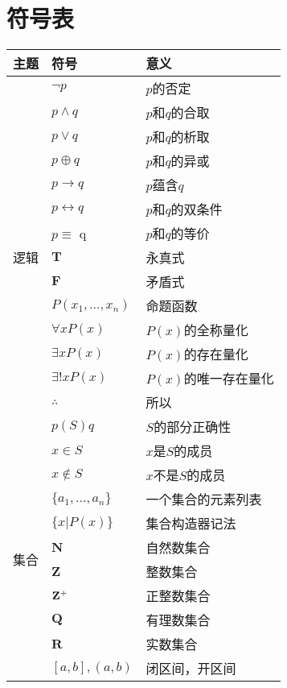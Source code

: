 \documentclass[UTF8]{ctexart}
\begin{document}
\section{符号表}
\begin{longtable}{|p{9em}|p{15em}|p{15em}|}
  \bottomrule
  \hfil 主题 & \hfil 符号 & \hfil 意义\\
  \hline
  \multirow{15}{9em}{逻辑} & $\neg p$ & $p$的否定\\
  \cline{2-3}
    & $p\land q$ & $p$和$q$的合取\\
  \cline{2-3}
    & $p\lor q$ & $p$和$q$的析取\\
  \cline{2-3}
    & $p\oplus q$ & $p$和$q$的异或\\
  \cline{2-3}
    & $p\rightarrow q$ & $p$蕴含$q$\\
  \cline{2-3}
    & $p\leftrightarrow q$ & $p$和$q$的双条件\\
  \cline{2-3}
    & $p\equiv$ q & $p$和$q$的等价\\
  \cline{2-3}
    & $\mathbf{T}$ & 永真式\\
  \cline{2-3}
    & $\mathbf{F}$ & 矛盾式\\
  \cline{2-3}
    & $P(x_1, ... , x_n)$ & 命题函数\\
  \cline{2-3}
    & $\forall xP(x)$ & $P(x)$的全称量化\\
  \cline{2-3}
    & $\exists xP(x)$ & $P(x)$的存在量化\\
  \cline{2-3}
    & $\exists !xP(x)$ & $P(x)$的唯一存在量化\\
  \cline{2-3}
    & $\therefore$ & 所以\\
  \cline{2-3}
    & $p(S)q$ & $S$的部分正确性\\
  \hline
  \multirow{28}{9em}{集合} & $x\in S$ & $x$是$S$的成员\\
  \cline{2-3}
    & $x\notin S$ & $x$不是$S$的成员\\
  \cline{2-3}
    & $\{a_1, ... , a_n\}$ & 一个集合的元素列表\\
  \cline{2-3}
    & $\{x|P(x)\}$ & 集合构造器记法\\
  \cline{2-3}
    & $\mathbf{N}$ & 自然数集合\\
  \cline{2-3}
    & $\mathbf{Z}$ & 整数集合\\
  \cline{2-3}
    & $\rm\bf \mathbf{Z}^+$ & 正整数集合\\
  \cline{2-3}
    & $\mathbf{Q}$ & 有理数集合\\
  \cline{2-3}
    & $\mathbf{R}$ & 实数集合\\
  \cline{2-3}
    & $[a, b], (a, b)$ & 闭区间，开区间\\

\end{longtable}
\end{document}
